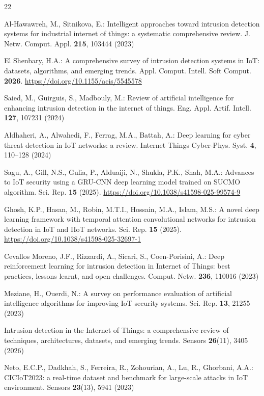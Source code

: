 \documentclass{llncs}
\begin{document}
\begin{thebibliography}{22}
\setlength{\itemsep}{-2pt}

Al-Hawawreh, M., Sitnikova, E.: Intelligent approaches toward intrusion detection systems for industrial internet of things: a systematic comprehensive review. J. Netw. Comput. Appl. \textbf{215}, 103444 (2023)

El Shenbary, H.A.: A comprehensive survey of intrusion detection systems in IoT: datasets, algorithms, and emerging trends. Appl. Comput. Intell. Soft Comput. \textbf{2026}. \url{https://doi.org/10.1155/acis/5545578}

Saied, M., Guirguis, S., Madbouly, M.: Review of artificial intelligence for enhancing intrusion detection in the internet of things. Eng. Appl. Artif. Intell. \textbf{127}, 107231 (2024)

Aldhaheri, A., Alwahedi, F., Ferrag, M.A., Battah, A.: Deep learning for cyber threat detection in IoT networks: a review. Internet Things Cyber-Phys. Syst. \textbf{4}, 110--128 (2024)

Sagu, A., Gill, N.S., Gulia, P., Alduaiji, N., Shukla, P.K., Shah, M.A.: Advances to IoT security using a GRU-CNN deep learning model trained on SUCMO algorithm. Sci. Rep. \textbf{15} (2025). \url{https://doi.org/10.1038/s41598-025-99574-9}

Ghosh, K.P., Hasan, M., Robin, M.T.I., Hossain, M.A., Islam, M.S.: A novel deep learning framework with temporal attention convolutional networks for intrusion detection in IoT and IIoT networks. Sci. Rep. \textbf{15} (2025). \url{https://doi.org/10.1038/s41598-025-32697-1}

Cevallos Moreno, J.F., Rizzardi, A., Sicari, S., Coen-Porisini, A.: Deep reinforcement learning for intrusion detection in Internet of Things: best practices, lessons learnt, and open challenges. Comput. Netw. \textbf{236}, 110016 (2023)

Meziane, H., Ouerdi, N.: A survey on performance evaluation of artificial intelligence algorithms for improving IoT security systems. Sci. Rep. \textbf{13}, 21255 (2023)

Intrusion detection in the Internet of Things: a comprehensive review of techniques, architectures, datasets, and emerging trends. Sensors \textbf{26}(11), 3405 (2026)

Neto, E.C.P., Dadkhah, S., Ferreira, R., Zohourian, A., Lu, R., Ghorbani, A.A.: CICIoT2023: a real-time dataset and benchmark for large-scale attacks in IoT environment. Sensors \textbf{23}(13), 5941 (2023)


\end{thebibliography}
\end{document}
